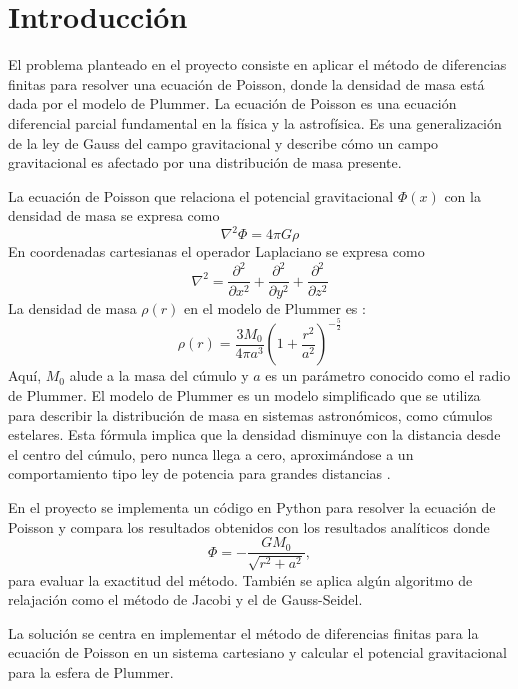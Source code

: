 \documentclass[reprint,amsmath,amssymb,aps]{revtex4-1}
\begin{document}
\section{Introducción}
El problema planteado en el proyecto consiste en aplicar el método de diferencias finitas para resolver una ecuación de Poisson, donde la densidad de masa está dada por el modelo de Plummer. La ecuación de Poisson es una ecuación diferencial parcial fundamental en la física y la astrofísica. Es una generalización de la ley de Gauss del campo gravitacional y describe cómo un campo gravitacional es afectado por una distribución de masa presente. 

La ecuación de Poisson que relaciona el potencial gravitacional $\Phi(x)$ con la densidad de masa se expresa como 
\begin{equation}
    \nabla^2 \Phi = 4 \pi G \rho
\end{equation}
En coordenadas cartesianas el operador Laplaciano se expresa como
\begin{equation}
    \nabla^2 = \frac{\partial^2}{\partial x^2} + \frac{\partial^2}{\partial y^2} + \frac{\partial^2}{\partial z^2}
\end{equation}
La densidad de masa $\rho(r)$ en el modelo de Plummer es \cite{plummer}:
\begin{equation}\label{plummer}
\rho(r) = \frac{3M_0}{4\pi a^3} \left( 1 + \frac{r^2}{a^2} \right)^{-\frac{5}{2}}
\end{equation}
Aquí, $M_0$ alude a la masa del cúmulo y $a$ es un parámetro conocido como el radio de Plummer. El modelo de Plummer es un modelo simplificado que se utiliza para describir la distribución de masa en sistemas astronómicos, como cúmulos estelares. Esta fórmula implica que la densidad disminuye con la distancia desde el centro del cúmulo, pero nunca llega a cero, aproximándose a un comportamiento tipo ley de potencia para grandes distancias \cite{poissonGauss}.

En el proyecto se implementa un código en Python para resolver la ecuación de Poisson y compara los resultados obtenidos con los resultados analíticos donde
\begin{equation}
\varPhi=-\frac{GM_{0}}{\sqrt{r^2+a^2}},
\end{equation}
para evaluar la exactitud del método. También se aplica algún algoritmo de relajación como el método de Jacobi y el de Gauss-Seidel.

La solución se centra en implementar el método de diferencias finitas para la ecuación de Poisson en un sistema cartesiano y calcular el potencial gravitacional para la esfera de Plummer.
\end{document}
